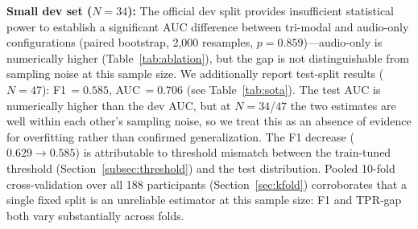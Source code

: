 \documentclass[journal]{IEEEtran}
\begin{document}
\textbf{Small dev set ($N{=}34$):} The official dev split provides
insufficient statistical power to establish a significant AUC
difference between tri-modal and audio-only configurations
(paired bootstrap, 2,000 resamples, $p=0.859$)---audio-only is
numerically higher (Table~\ref{tab:ablation}), but the gap is not
distinguishable from sampling noise at this sample size. We
additionally report test-split results ($N{=}47$): F1\,$=0.585$,
AUC\,$=0.706$ (see Table~\ref{tab:sota}). The test AUC is numerically
higher than the dev AUC, but at $N{=}34$/$47$ the two estimates are
well within each other's sampling noise, so we treat this as an
absence of evidence for overfitting rather than confirmed
generalization. The F1 decrease
($0.629\to0.585$) is attributable to threshold mismatch between
the train-tuned threshold (Section~\ref{subsec:threshold}) and the
test distribution. Pooled 10-fold
cross-validation over all 188 participants
(Section~\ref{sec:kfold}) corroborates that a single fixed split is
an unreliable estimator at this sample size: F1 and TPR-gap both
vary substantially across folds.
\end{document}
